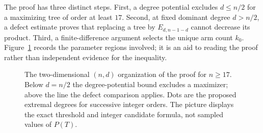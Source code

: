 \documentclass[11pt,a4paper]{article}
\numberwithin{equation}{section}
\begin{document}
The proof has three distinct steps. First, a degree potential excludes $d\le n/2$ for a maximizing tree of order at least $17$. Second, at fixed dominant degree $d>n/2$, a defect estimate proves that replacing a tree by $E_{d,n-1-d}$ cannot decrease its product. Third, a finite-difference argument selects the unique arm count $k_0$. Figure~\ref{fig:degree-region} records the parameter regions involved; it is an aid to reading the proof rather than independent evidence for the inequality.

\begin{figure}[htbp]
\centering
{}
\caption{The two-dimensional $(n,d)$ organization of the proof for $n\ge17$. Below $d=n/2$ the degree-potential bound excludes a maximizer; above the line the defect comparison applies. Dots are the proposed extremal degrees for successive integer orders. The picture displays the exact threshold and integer candidate formula, not sampled values of $P(T)$.}
\label{fig:degree-region}
\end{figure}
\end{document}
